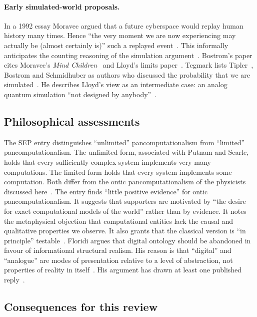 \paragraph{Early simulated-world proposals.} In a 1992 essay Moravec argued
that a future cyberspace would replay human history many times. Hence ``the very moment we are now
experiencing may actually be (almost certainly is)'' such a replayed
event~\cite{Moravec1992pigs}. This informally anticipates the counting
reasoning of the simulation argument~\cite{Bostrom2003are}. Bostrom's paper cites Moravec's
\emph{Mind Children}~\cite{Moravec1988mind} and Lloyd's limits
paper~\cite{Lloyd2000ultimate}. Tegmark lists Tipler~\cite{Tipler1994physics},
Bostrom and Schmidhuber as authors who discussed the probability that we are
simulated~\cite{Tegmark2008mathematical}. He describes Lloyd's view as an
intermediate case: an analog quantum simulation ``not designed by
anybody''~\cite{Tegmark2008mathematical}.

\subsection{Philosophical assessments}
\label{sec:digital-physics:philosophy}

The SEP entry distinguishes ``unlimited'' pancomputationalism from ``limited''
pancomputationalism. The unlimited form, associated with Putnam and Searle,
holds that every sufficiently complex system implements very many computations.
The limited form holds that every system implements some computation. Both
differ from the ontic pancomputationalism of the physicists discussed
here~\cite{Piccinini2025computation}. The entry finds ``little positive
evidence'' for ontic pancomputationalism. It suggests that supporters are
motivated by ``the desire for exact computational models of the world'' rather
than by evidence. It notes the metaphysical objection that computational
entities lack the causal and qualitative properties we observe. It also grants
that the classical version is ``in principle'' testable~\cite{Piccinini2025computation}.
Floridi argues that digital ontology should be abandoned in favour of
informational structural realism. His reason is that ``digital'' and
``analogue'' are modes of presentation relative to a level of abstraction, not
properties of reality in itself~\cite{Floridi2009against}. His argument has
drawn at least one published reply~\cite{Sdrolia2014rethinking}.

\subsection{Consequences for this review}
\label{sec:digital-physics:consequences}


